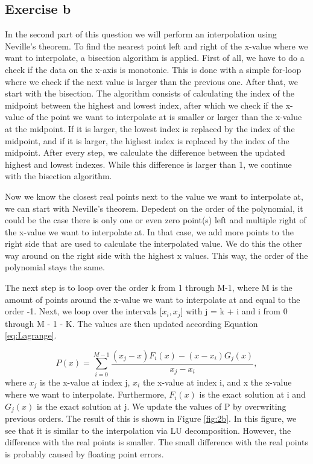 \subsection{Exercise b}
In the second part of this question we will perform an interpolation using Neville's theorem. To find the nearest point left and right of the x-value where we want to interpolate, a bisection algorithm is applied. First of all, we have to do a check if the data on the x-axis is monotonic. This is done with a simple for-loop where we check if the next value is larger than the previous one. After that, we start with the bisection.
The algorithm consists of calculating the index of the midpoint between the highest and lowest index, after which we check if the x-value of the point we want to interpolate at is smaller or larger than the x-value at the midpoint. If it is larger, the lowest index is replaced by the index of the midpoint, and if it is larger, the highest index is replaced by the index of the midpoint. After every step, we calculate the difference between the updated highest and lowest indexes. While this difference is larger than 1, we continue with the bisection algorithm. 

Now we know the closest real points next to the value we want to interpolate at, we can start with Neville's theorem. Depedent on the order of the polynomial, it could be the case there is only one or even zero point(s) left and multiple right of the x-value we want to interpolate at. In that case, we add more points to the right side that are used to calculate the interpolated value. We do this the other way around on the right side with the highest x values. This way, the order of the polynomial stays the same.

The next step is to loop over the order k from 1 through M-1, where M is the amount of points around the x-value we want to interpolate at and equal to the order -1. Next, we loop over the intervals [$x_i, x_j$] with j = k + i and i from 0 through M - 1 - K. The values are then updated according Equation \ref{eq:Lagrange}.

\begin{equation}\label{eq:Lagrange}
    P(x) = \sum^{M-1}_{i=0}{\frac{(x_j - x)F_i(x) - (x-x_i)G_j(x)}{x_j-x_i}},
\end{equation}
where $x_j$ is the x-value at index j, $x_i$ the x-value at index i, and x the x-value where we want to interpolate. Furthermore, $F_i(x)$ is the exact solution at i and $G_j(x)$ is the exact solution at j. We update the values of P by overwriting previous orders. The result of this is shown in Figure \ref{fig:2b}. In this figure, we see that it is similar to the interpolation via LU decomposition. However, the difference with the real points is smaller. The small difference with the real points is probably caused by floating point errors.

